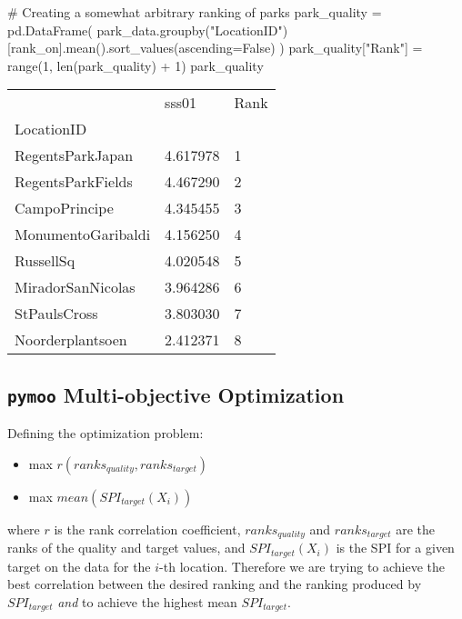 \documentclass[
  authoryear,
  preprint,
  3p]{elsarticle}
\newenvironment{Shaded}{\begin{snugshade}}{\end{snugshade}}
\newcommand{\BuiltInTok}[1]{\textcolor[rgb]{0.00,0.23,0.31}{#1}}
\newcommand{\CommentTok}[1]{\textcolor[rgb]{0.37,0.37,0.37}{#1}}
\newcommand{\DecValTok}[1]{\textcolor[rgb]{0.68,0.00,0.00}{#1}}
\newcommand{\NormalTok}[1]{\textcolor[rgb]{0.00,0.23,0.31}{#1}}
\newcommand{\OperatorTok}[1]{\textcolor[rgb]{0.37,0.37,0.37}{#1}}
\newcommand{\StringTok}[1]{\textcolor[rgb]{0.13,0.47,0.30}{#1}}
\newcommand{\VariableTok}[1]{\textcolor[rgb]{0.07,0.07,0.07}{#1}}
\providecommand{\tightlist}{%
  \setlength{\itemsep}{0pt}\setlength{\parskip}{0pt}}\usepackage{longtable,booktabs,array}
\begin{document}
\begin{Shaded}
\begin{Highlighting}[]
\CommentTok{\# Creating a somewhat arbitrary ranking of parks}
\NormalTok{park\_quality }\OperatorTok{=}\NormalTok{ pd.DataFrame(}
\NormalTok{    park\_data.groupby(}\StringTok{"LocationID"}\NormalTok{)[rank\_on].mean().sort\_values(ascending}\OperatorTok{=}\VariableTok{False}\NormalTok{)}
\NormalTok{)}
\NormalTok{park\_quality[}\StringTok{"Rank"}\NormalTok{] }\OperatorTok{=} \BuiltInTok{range}\NormalTok{(}\DecValTok{1}\NormalTok{, }\BuiltInTok{len}\NormalTok{(park\_quality) }\OperatorTok{+} \DecValTok{1}\NormalTok{)}
\NormalTok{park\_quality}
\end{Highlighting}
\end{Shaded}

\begin{longtable}[]{@{}lll@{}}
\toprule\noalign{}
& sss01 & Rank \\
LocationID & & \\
\midrule\noalign{}
\endhead
\bottomrule\noalign{}
\endlastfoot
RegentsParkJapan & 4.617978 & 1 \\
RegentsParkFields & 4.467290 & 2 \\
CampoPrincipe & 4.345455 & 3 \\
MonumentoGaribaldi & 4.156250 & 4 \\
RussellSq & 4.020548 & 5 \\
MiradorSanNicolas & 3.964286 & 6 \\
StPaulsCross & 3.803030 & 7 \\
Noorderplantsoen & 2.412371 & 8 \\
\end{longtable}

\subsection{\texorpdfstring{\texttt{pymoo} Multi-objective
Optimization}{pymoo Multi-objective Optimization}}\label{pymoo-multi-objective-optimization}

Defining the optimization problem:

\begin{itemize}
\tightlist
\item
  max \(r(ranks_{quality}, ranks_{target})\)
\item
  max \(mean(SPI_{target}(X_i))\)
\end{itemize}

where \(r\) is the rank correlation coefficient, \(ranks_{quality}\) and
\(ranks_{target}\) are the ranks of the quality and target values, and
\(SPI_{target}(X_i)\) is the SPI for a given target on the data for the
\(i\)-th location. Therefore we are trying to achieve the best
correlation between the desired ranking and the ranking produced by
\(SPI_{target}\) \emph{and} to achieve the highest mean
\(SPI_{target}\).
\end{document}
